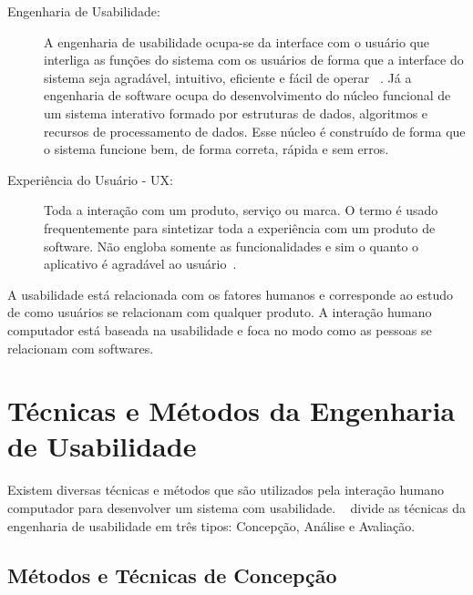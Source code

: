\begin{description}
\item[Engenharia de Usabilidade:]

A engenharia de usabilidade ocupa-se da interface com o usuário que interliga as funções do sistema com os usuários de forma que a interface do sistema seja agradável, intuitivo, eficiente e fácil de operar ~\cite{cybis2010}. Já a engenharia de software ocupa do desenvolvimento do núcleo funcional de um sistema interativo formado por estruturas de dados, algoritmos e recursos de processamento de dados. Esse núcleo é construído de forma que o sistema funcione bem, de forma correta, rápida e sem erros.
%


\item[Experiência do Usuário - UX: ]

Toda a interação com um produto, serviço ou marca. O termo é usado frequentemente para sintetizar toda a experiência com um produto de software. Não engloba  somente as funcionalidades e sim o quanto o aplicativo é agradável ao usuário~\cite{travis2013}.
%	


\end{description}

A usabilidade está relacionada com os fatores humanos e corresponde ao estudo de como usuários se relacionam com qualquer produto. A interação humano computador está baseada na usabilidade e foca no modo como as pessoas se relacionam com softwares.


\section{Técnicas e Métodos da Engenharia de Usabilidade}


Existem diversas técnicas e métodos que são utilizados pela interação humano computador para desenvolver um sistema com usabilidade. ~ divide as técnicas da engenharia de usabilidade em três tipos: Concepção, Análise e Avaliação. 

\subsection{Métodos e Técnicas de Concepção}

